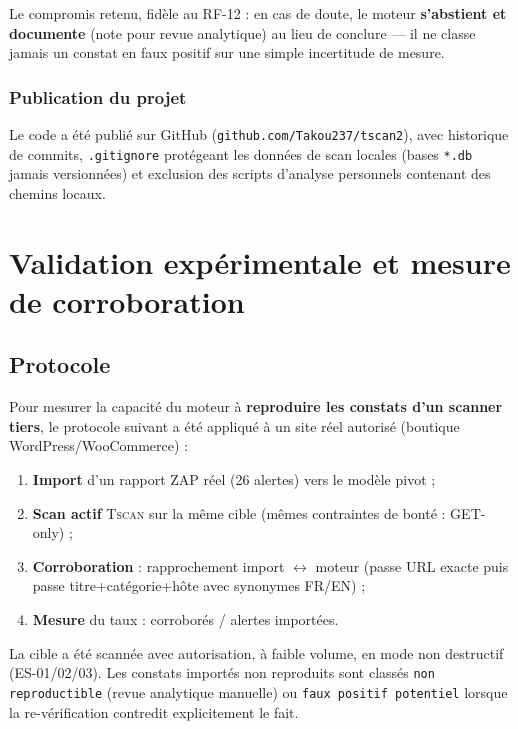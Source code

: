 \documentclass[11pt,a4paper]{report}
\newcommand{\tscan}{\textsc{Tscan}}
\newcommand{\code}[1]{\texttt{#1}}
\begin{document}
Le compromis retenu, fidèle au RF-12 : en cas de doute, le moteur \textbf{s'abstient et
documente} (note pour revue analytique) au lieu de conclure --- il ne classe jamais un
constat en faux positif sur une simple incertitude de mesure.

\subsection{Publication du projet}

Le code a été publié sur GitHub (\code{github.com/Takou237/tscan2}), avec historique de
commits, \code{.gitignore} protégeant les données de scan locales (bases \code{*.db}
jamais versionnées) et exclusion des scripts d'analyse personnels contenant des chemins
locaux.

\chapter{Validation expérimentale et mesure de corroboration}

\section{Protocole}

Pour mesurer la capacité du moteur à \textbf{reproduire les constats d'un scanner tiers},
le protocole suivant a été appliqué à un site réel autorisé (boutique
WordPress/WooCommerce) :

\begin{enumerate}[leftmargin=1.8em]
  \item \textbf{Import} d'un rapport ZAP réel (26 alertes) vers le modèle pivot ;
  \item \textbf{Scan actif} \tscan{} sur la même cible (mêmes contraintes de bonté :
        GET-only) ;
  \item \textbf{Corroboration} : rapprochement import $\leftrightarrow$ moteur (passe URL
        exacte puis passe titre+catégorie+hôte avec synonymes FR/EN) ;
  \item \textbf{Mesure} du taux : corroborés / alertes importées.
\end{enumerate}

La cible a été scannée avec autorisation, à faible volume, en mode non destructif
(ES-01/02/03). Les constats importés non reproduits sont classés \code{non reproductible}
(revue analytique manuelle) ou \code{faux positif potentiel} lorsque la re-vérification
contredit explicitement le fait.
\end{document}
